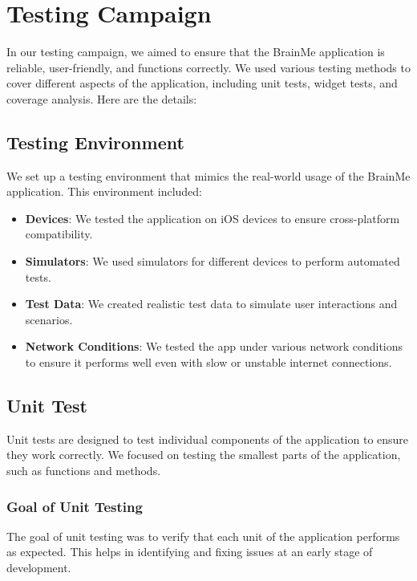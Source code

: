 \section{Testing Campaign}

In our testing campaign, we aimed to ensure that the BrainMe application is reliable, user-friendly, and functions correctly. We used various testing methods to cover different aspects of the application, including unit tests, widget tests, and coverage analysis. Here are the details:

\subsection{Testing Environment}

We set up a testing environment that mimics the real-world usage of the BrainMe application. This environment included:

\begin{itemize}
    \item \textbf{Devices}: We tested the application on iOS devices to ensure cross-platform compatibility.
    \item \textbf{Simulators}: We used simulators for different devices to perform automated tests.
    \item \textbf{Test Data}: We created realistic test data to simulate user interactions and scenarios.
    \item \textbf{Network Conditions}: We tested the app under various network conditions to ensure it performs well even with slow or unstable internet connections.
\end{itemize}

\subsection{Unit Test}

Unit tests are designed to test individual components of the application to ensure they work correctly. We focused on testing the smallest parts of the application, such as functions and methods.

\subsubsection{Goal of Unit Testing}

The goal of unit testing was to verify that each unit of the application performs as expected. This helps in identifying and fixing issues at an early stage of development.

